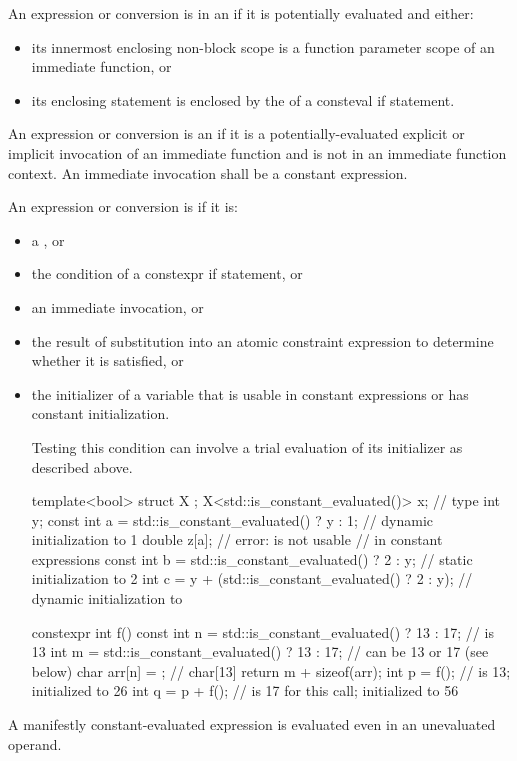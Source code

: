 \pnum
An expression or conversion is in an 
if it is potentially evaluated and either:
\begin{itemize}
\item
its innermost enclosing non-block scope is
a function parameter scope of an immediate function, or
\item
its enclosing statement is enclosed by
the  of a consteval if statement.
\end{itemize}
An expression or conversion is an 
if it is a potentially-evaluated explicit or implicit invocation of
an immediate function and
is not in an immediate function context.
An immediate invocation shall be a constant expression.

\pnum
An expression or conversion is 
if it is:
\begin{itemize}
\item a , or
\item the condition of a constexpr if statement, or
\item an immediate invocation, or
\item the result of substitution into an atomic constraint expression
to determine whether it is satisfied, or
\item the initializer of a variable
that is usable in constant expressions or
has constant initialization.
\begin{footnote}
Testing this condition
can involve a trial evaluation of its initializer as described above.
\end{footnote}
\begin{example}
\begin{codeblock}
template<bool> struct X {};
X<std::is_constant_evaluated()> x;                      // type 
int y;
const int a = std::is_constant_evaluated() ? y : 1;     // dynamic initialization to 1
double z[a];                                            // error:  is not usable
                                                        // in constant expressions
const int b = std::is_constant_evaluated() ? 2 : y;     // static initialization to 2
int c = y + (std::is_constant_evaluated() ? 2 : y);     // dynamic initialization to 

constexpr int f() {
  const int n = std::is_constant_evaluated() ? 13 : 17; //  is 13
  int m = std::is_constant_evaluated() ? 13 : 17;       //  can be 13 or 17 (see below)
  char arr[n] = {}; // char[13]
  return m + sizeof(arr);
}
int p = f();                                            //  is 13; initialized to 26
int q = p + f();                                        //  is 17 for this call; initialized to 56
\end{codeblock}
\end{example}
\end{itemize}
\begin{note}
A manifestly constant-evaluated expression
is evaluated even in an unevaluated operand.
\end{note}

